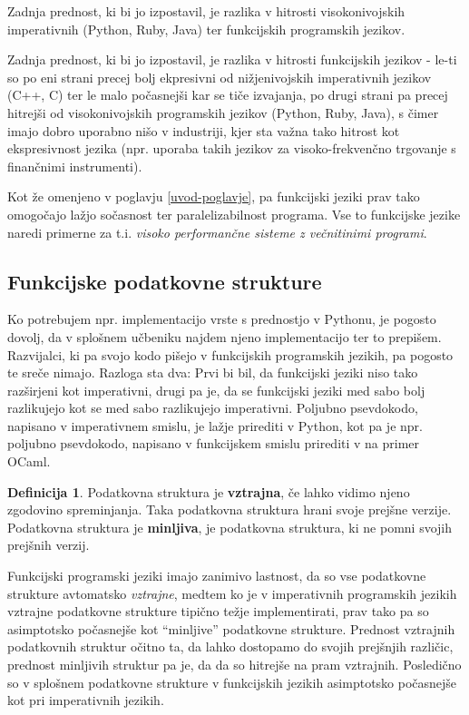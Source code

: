 \documentclass[12pt,a4paper]{amsart}
\theoremstyle{definition} %
\newtheorem{definicija}{Definicija}[section]
\theoremstyle{plain} %
\begin{document}
Zadnja prednost, ki bi jo izpostavil, je razlika v hitrosti visokonivojskih imperativnih (Python, Ruby, Java) ter funkcijskih programskih jezikov. 

Zadnja prednost, ki bi jo izpostavil, je razlika v hitrosti funkcijskih jezikov - le-ti so po eni strani precej bolj ekpresivni od nižjenivojskih imperativnih jezikov (C++, C) ter le malo počasnejši kar se tiče izvajanja, po drugi strani pa precej  hitrejši od visokonivojskih programskih jezikov (Python, Ruby, Java), s čimer imajo dobro uporabno nišo v industriji, kjer sta važna tako hitrost kot ekspresivnost jezika (npr. uporaba takih jezikov za visoko-frekvenčno trgovanje s finančnimi instrumenti).

Kot že omenjeno v poglavju \ref{uvod-poglavje}, pa funkcijski jeziki prav tako omogočajo lažjo sočasnost ter paralelizabilnost programa. Vse to funkcijske jezike naredi primerne za t.i. \textit{visoko performančne sisteme z večnitinimi programi}.


\subsection{Funkcijske podatkovne strukture}

Ko potrebujem npr. implementacijo vrste s prednostjo v Pythonu, je pogosto dovolj, da v splošnem učbeniku najdem njeno implementacijo ter to prepišem. Razvijalci, ki pa svojo kodo pišejo v funkcijskih programskih jezikih, pa pogosto te sreče nimajo. Razloga sta dva: Prvi bi bil, da funkcijski jeziki niso tako razširjeni kot imperativni, drugi pa je, da se funkcijski jeziki med sabo bolj razlikujejo kot se med sabo razlikujejo imperativni. Poljubno psevdokodo, napisano v imperativnem smislu, je lažje prirediti v Python, kot pa je npr. poljubno psevdokodo, napisano v funkcijskem smislu prirediti v na primer OCaml.

\begin{definicija}
Podatkovna struktura je \textbf{vztrajna}, če lahko vidimo njeno zgodovino spreminjanja. Taka podatkovna struktura hrani svoje prejšne verzije.
Podatkovna struktura je \textbf{minljiva}, je podatkovna struktura, ki ne pomni svojih prejšnih verzij.
\end{definicija}

Funkcijski programski jeziki imajo zanimivo lastnost, da so vse podatkovne strukture avtomatsko \textit{vztrajne}, medtem ko je v imperativnih programskih jezikih vztrajne podatkovne strukture tipično težje implementirati, prav tako pa so asimptotsko počasnejše kot ``minljive'' podatkovne strukture. Prednost vztrajnih podatkovnih struktur očitno ta, da lahko dostopamo do svojih prejšnjih različic, prednost minljivih struktur pa je, da da so hitrejše na pram vztrajnih. Posledično so v splošnem podatkovne strukture v funkcijskih jezikih asimptotsko počasnejše kot pri imperativnih jezikih.
\end{document}
